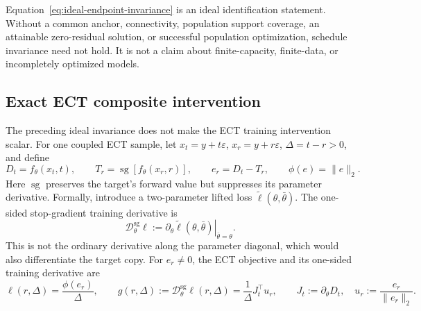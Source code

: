 \documentclass{article}
\newif\ifshowcomments
\newcommand{\theorynote}[1]{%
  \ifshowcomments{\color{theoryblue}\textbf{[THEORY CHECK: #1]}}\fi}
\newcommand{\sg}{\operatorname{sg}}
\newcommand{\Dsg}{\mathcal{D}^{\mathrm{sg}}_\theta}
\begin{document}
Equation~\eqref{eq:ideal-endpoint-invariance} is an ideal identification
statement. Without a common anchor, connectivity, population support coverage,
an attainable zero-residual solution, or successful population optimization,
schedule invariance need not hold. It is not a claim about finite-capacity,
finite-data, or incompletely optimized models.

\theorynote{Keep the endpoint-invariance statement conditional. If the method
notation later replaces exact transport by a numerical solver, revise the
transport assumption rather than weakening it silently.}

\subsection{Exact ECT composite intervention}
\label{sec:theory-composite-intervention}

The preceding ideal invariance does not make the ECT training intervention
scalar. For one coupled ECT sample, let
$x_t=y+t\varepsilon$, $x_r=y+r\varepsilon$, $\Delta=t-r>0$, and define
\begin{equation}
  D_t=f_\theta(x_t,t),\qquad
  T_r=\sg\!\left[f_\theta(x_r,r)\right],\qquad
  e_r=D_t-T_r,\qquad
  \phi(e)=\lVert e\rVert_2 .
  \label{eq:ect-residual}
\end{equation}
Here $\sg$ preserves the target's forward value but suppresses its parameter
derivative. Formally, introduce a two-parameter lifted loss
$\widetilde\ell(\theta,\bar\theta)$. The one-sided stop-gradient training
derivative is
\begin{equation}
  \Dsg\ell
  :=\left.
  \partial_\theta\widetilde\ell(\theta,\bar\theta)
  \right|_{\bar\theta=\theta}.
  \label{eq:sg-training-derivative}
\end{equation}
This is not the ordinary derivative along the parameter diagonal, which would
also differentiate the target copy. For $e_r\neq0$, the ECT objective and its
one-sided training derivative are
\begin{equation}
  \ell(r,\Delta)=\frac{\phi(e_r)}{\Delta},
  \qquad
  g(r,\Delta):=\Dsg\ell(r,\Delta)
  =\frac{1}{\Delta}J_t^\top u_r,
  \qquad
  J_t:=\partial_\theta D_t,
  \quad
  u_r:=\frac{e_r}{\lVert e_r\rVert_2}.
  \label{eq:exact-ect-gradient}
\end{equation}
\end{document}
